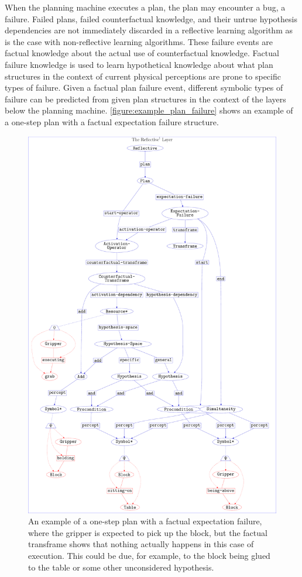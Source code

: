 When the planning machine executes a plan, the plan may encounter a
bug, a failure.  Failed plans, failed counterfactual knowledge, and
their untrue hypothesis dependencies are not immediately discarded in
a reflective learning algorithm as is the case with non-reflective
learning algorithms.  These failure events are factual knowledge about
the actual use of counterfactual knowledge.  Factual failure knowledge
is used to learn hypothetical knowledge about what plan structures in
the context of current physical perceptions are prone to specific
types of failure.  Given a factual plan failure event, different
symbolic types of failure can be predicted from given plan structures
in the context of the layers below the planning machine.
{\mbox{\autoref{figure:example_plan_failure}}} shows an example of a
one-step plan with a factual expectation failure structure.
\begin{figure}
\hspace*{-3cm}\includegraphics[width=16cm]{gfx/example_plan_failure}
\caption[An example of a one-step plan with a factual expectation
  failure.]{An example of a one-step plan with a factual expectation
  failure, where the gripper is expected to pick up the block, but the
  factual transframe shows that nothing actually happens in this case
  of execution.  This could be due, for example, to the block being
  glued to the table or some other unconsidered hypothesis.}
\label{figure:example_plan_failure}
\end{figure}

